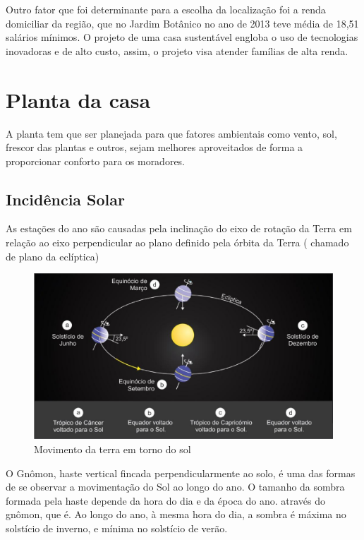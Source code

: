 	Outro fator que foi determinante para a escolha da localização foi a renda domiciliar da região, que no Jardim Botânico no ano de 2013 teve média de 18,51 salários mínimos\cite{2013SeplanCodeplan}. O projeto de uma casa sustentável engloba o uso de tecnologias inovadoras e de alto custo, assim, o projeto visa atender famílias de alta renda.

\newpage

\section{Planta da casa}

A planta tem que ser planejada para que fatores ambientais como vento, sol, frescor das plantas e outros, sejam melhores aproveitados de forma a proporcionar conforto para os moradores.

\subsection{Incidência Solar}

As estações do ano são causadas pela inclinação do eixo de rotação da Terra em relação ao eixo perpendicular ao plano definido pela órbita da Terra ( chamado de plano da eclíptica) 

\begin{figure}[H]
  \begin{center}
	\includegraphics[keepaspectratio,scale=0.4,angle=0]{figuras/movimento.eps}
	\caption{Movimento da terra em torno do sol}
  \end{center}
\end{figure}

O Gnômon, haste vertical fincada perpendicularmente ao solo, é uma das formas de se observar a movimentação do Sol ao longo do ano. O tamanho da sombra formada pela haste depende da hora do dia e da época do ano.  através do gnômon, que é. Ao longo do ano, à mesma hora do dia, a sombra é máxima no solstício de inverno, e mínima no solstício de verão.

